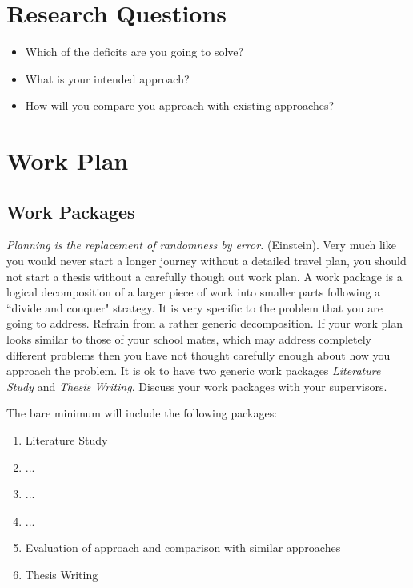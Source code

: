 \documentclass[master]{thesis_proposal}
\begin{document}
\section{Research Questions}
\begin{itemize}
    \item Which of the deficits are you going to solve?
    \item What is your intended approach?
    \item How will you compare you approach with existing approaches?
\end{itemize}

\section{Work Plan}

\subsection{Work Packages}
\emph{Planning is the replacement of randomness by error.} (Einstein). Very much like you would never start a longer journey without a detailed travel plan, you should not start a thesis without a carefully though out work plan. A work package is a logical decomposition of a larger piece of work into smaller parts following a ``divide and conquer" strategy. It is very specific to the problem that you are going to address. Refrain from a rather generic decomposition. If your work plan looks similar to those of your school mates, which may address completely different problems then you have not thought carefully enough about how you approach the problem. It is ok to have two generic work packages \emph{Literature Study} and \emph{Thesis Writing}. Discuss your work packages with your supervisors.

The bare minimum will include the following packages:
\begin{enumerate}
    \item[WP1] Literature Study
    \item[WP2] ...
    \item[WP3] ...
    \item  ...
    \item[WPy] Evaluation of approach and comparison with similar approaches
    \item[WPz] Thesis Writing
\end{enumerate}
\end{document}
